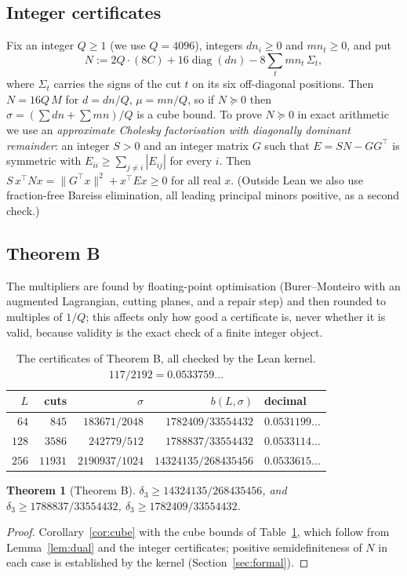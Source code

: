 \documentclass[11pt]{amsart}
\newtheorem{theorem}{Theorem}[section]
\theoremstyle{remark}
\begin{document}
\subsection{Integer certificates}
Fix an integer $Q\ge1$ (we use $Q=4096$), integers $dn_i\ge0$ and $mn_t\ge0$, and put
\[N:=2Q\cdot(8C)+16\operatorname{diag}(dn)-8\sum_tmn_t\,\Sigma_t,\]
where $\Sigma_t$ carries the signs of the cut $t$ on its six off-diagonal positions. Then $N=16Q\,M$ for $d=dn/Q$, $\mu=mn/Q$, so if $N\succeq0$ then $\sigma=(\sum dn+\sum mn)/Q$ is a cube bound.
To prove $N\succeq0$ in exact arithmetic we use an \emph{approximate Cholesky factorisation with diagonally dominant remainder}: an integer $S>0$ and an integer matrix $G$ such that $E=SN-GG^{\top}$ is
symmetric with $E_{ii}\ge\sum_{j\ne i}|E_{ij}|$ for every $i$. Then $S\,x^{\top}Nx=\|G^{\top}x\|^2+x^{\top}Ex\ge0$ for all real $x$. (Outside Lean we also use fraction-free Bareiss elimination,
all leading principal minors positive, as a second check.)

\subsection{Theorem B}
The multipliers are found by floating-point optimisation (Burer--Monteiro with an augmented Lagrangian, cutting planes, and a repair step) and then rounded to multiples of $1/Q$; this affects only how good a certificate is, never whether it is valid, because validity is the exact check of a finite integer object.
\begin{table}[h]
\centering
\begin{tabular}{rrrrl}
\toprule
$L$ & cuts & $\sigma$ & $b(L,\sigma)$ & decimal\\
\midrule
$64$ & $845$ & $183671/2048$ & $1782409/33554432$ & $0.0531199\ldots$\\
$128$ & $3586$ & $242779/512$ & $1788837/33554432$ & $0.0533114\ldots$\\
$256$ & $11931$ & $2190937/1024$ & $14324135/268435456$ & $0.0533615\ldots$\\
\bottomrule
\end{tabular}
\caption{The certificates of Theorem B, all checked by the Lean kernel. $117/2192=0.0533759\ldots$}\label{tab:B}
\end{table}

\begin{theorem}[Theorem B]\label{thm:B}
$\delta_3\ge14324135/268435456$, and $\delta_3\ge1788837/33554432$, $\delta_3\ge1782409/33554432$.
\end{theorem}
\begin{proof}
Corollary~\ref{cor:cube} with the cube bounds of Table~\ref{tab:B}, which follow from Lemma~\ref{lem:dual} and the integer certificates; positive semidefiniteness of $N$ in each case is established by the kernel (Section~\ref{sec:formal}).
\end{proof}
\end{document}
